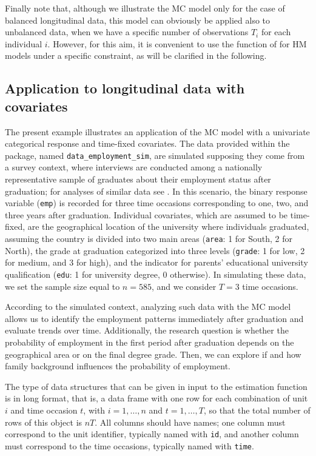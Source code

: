 Finally note that, although we illustrate the MC model only for the case
of balanced longitudinal data, this model can obviously be applied also
to unbalanced data, when we have a specific number of observations \(T_i\)
for each individual \(i\). However, for this aim, it is convenient to use
the function of  for HM models under a specific
constraint, as will be clarified in the following.

\hypertarget{subsec:MCapp}{%
\subsection{Application to longitudinal data with covariates}\label{subsec:MCapp}}

The present example illustrates an application of the MC model with a
univariate categorical response and time-fixed covariates. The data
provided within the package, named \texttt{data\_employment\_sim}, are simulated
supposing they come from a survey context, where interviews are
conducted among a nationally representative sample of graduates about
their employment status after graduation; for analyses of similar data
see \cite{bart:penn:11}. In this scenario, the binary response variable
(\texttt{emp}) is recorded for three time occasions corresponding to one, two,
and three years after graduation. Individual covariates, which are
assumed to be time-fixed, are the geographical location of the
university where individuals graduated, assuming the country is divided
into two main areas (\texttt{area}: 1 for South, 2 for North), the grade at
graduation categorized into three levels (\texttt{grade}: 1 for low, 2 for
medium, and 3 for high), and the indicator for parents' educational
university qualification (\texttt{edu}: 1 for university degree, 0 otherwise).
In simulating these data, we set the sample size equal to \(n=585\), and
we consider \(T=3\) time occasions.

According to the simulated context, analyzing such data with the MC
model allows us to identify the employment patterns immediately after
graduation and evaluate trends over time. Additionally, the research
question is whether the probability of employment in the first period
after graduation depends on the geographical area or on the final degree
grade. Then, we can explore if and how family background influences the
probability of employment.

The type of data structures that can be given in input to the estimation
function is in long format, that is, a data frame with one row for each
combination of unit \(i\) and time occasion \(t\), with \(i=1,\ldots, n\) and
\(t = 1,\ldots, T\), so that the total number of rows of this object is
\(n T\). All columns should have names; one column must correspond to the
unit identifier, typically named with \texttt{id}, and another column must
correspond to the time occasions, typically named with \texttt{time}.

